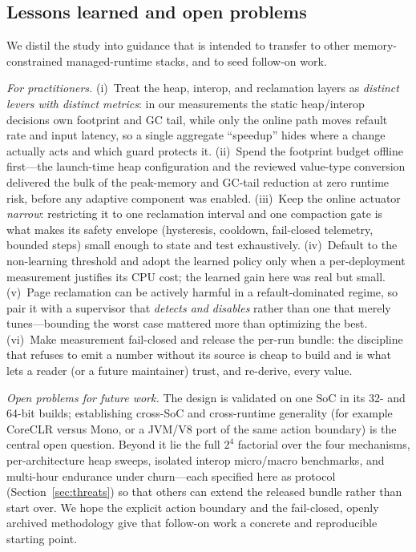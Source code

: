 \subsection{Lessons learned and open problems}
\label{sec:lessons}
We distil the study into guidance that is intended to transfer to other
memory-constrained managed-runtime stacks, and to seed follow-on work.

\emph{For practitioners.}
(i)~Treat the heap, interop, and reclamation layers as \emph{distinct levers
with distinct metrics}: in our measurements the static heap/interop decisions
own footprint and GC tail, while only the online path moves refault rate and
input latency, so a single aggregate ``speedup'' hides where a change actually
acts and which guard protects it.
(ii)~Spend the footprint budget offline first---the launch-time heap
configuration and the reviewed value-type conversion delivered the bulk of the
peak-memory and GC-tail reduction at zero runtime risk, before any adaptive
component was enabled.
(iii)~Keep the online actuator \emph{narrow}: restricting it to one reclamation
interval and one compaction gate is what makes its safety envelope (hysteresis,
cooldown, fail-closed telemetry, bounded steps) small enough to state and test
exhaustively.
(iv)~Default to the non-learning threshold and adopt the learned policy only
when a per-deployment measurement justifies its CPU cost; the learned gain here
was real but small.
(v)~Page reclamation can be actively harmful in a refault-dominated regime, so
pair it with a supervisor that \emph{detects and disables} rather than one that
merely tunes---bounding the worst case mattered more than optimizing the best.
(vi)~Make measurement fail-closed and release the per-run bundle: the discipline
that refuses to emit a number without its source is cheap to build and is what
lets a reader (or a future maintainer) trust, and re-derive, every value.

\emph{Open problems for future work.} The design is validated on one SoC in its
32- and 64-bit builds; establishing cross-SoC and cross-runtime generality (for
example CoreCLR versus Mono, or a JVM/V8 port of the same action boundary) is the
central open question. Beyond it lie the full $2^4$ factorial over the four
mechanisms, per-architecture heap sweeps, isolated interop micro/macro
benchmarks, and multi-hour endurance under churn---each specified here as
protocol (Section~\ref{sec:threats}) so that others can extend the released
bundle rather than start over. We hope the explicit action boundary and the
fail-closed, openly archived methodology give that follow-on work a concrete and
reproducible starting point.

